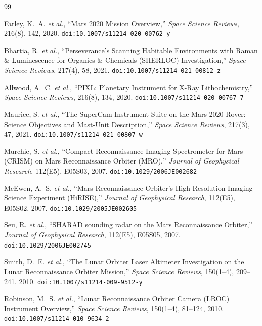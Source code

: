 \documentclass[12pt,a4paper]{article}
\begin{document}
\begin{thebibliography}{99}

Farley, K.~A. \textit{et al.},
``Mars 2020 Mission Overview,''
\textit{Space Science Reviews}, 216(8), 142, 2020.
\texttt{doi:10.1007/s11214-020-00762-y}

Bhartia, R. \textit{et al.},
``Perseverance's Scanning Habitable Environments with Raman \& Luminescence for Organics \& Chemicals (SHERLOC) Investigation,''
\textit{Space Science Reviews}, 217(4), 58, 2021.
\texttt{doi:10.1007/s11214-021-00812-z}

Allwood, A.~C. \textit{et al.},
``PIXL: Planetary Instrument for X-Ray Lithochemistry,''
\textit{Space Science Reviews}, 216(8), 134, 2020.
\texttt{doi:10.1007/s11214-020-00767-7}

Maurice, S. \textit{et al.},
``The SuperCam Instrument Suite on the Mars 2020 Rover: Science Objectives and Mast-Unit Description,''
\textit{Space Science Reviews}, 217(3), 47, 2021.
\texttt{doi:10.1007/s11214-021-00807-w}

Murchie, S. \textit{et al.},
``Compact Reconnaissance Imaging Spectrometer for Mars (CRISM) on Mars Reconnaissance Orbiter (MRO),''
\textit{Journal of Geophysical Research}, 112(E5), E05S03, 2007.
\texttt{doi:10.1029/2006JE002682}

McEwen, A.~S. \textit{et al.},
``Mars Reconnaissance Orbiter's High Resolution Imaging Science Experiment (HiRISE),''
\textit{Journal of Geophysical Research}, 112(E5), E05S02, 2007.
\texttt{doi:10.1029/2005JE002605}

Seu, R. \textit{et al.},
``SHARAD sounding radar on the Mars Reconnaissance Orbiter,''
\textit{Journal of Geophysical Research}, 112(E5), E05S05, 2007.
\texttt{doi:10.1029/2006JE002745}

Smith, D.~E. \textit{et al.},
``The Lunar Orbiter Laser Altimeter Investigation on the Lunar Reconnaissance Orbiter Mission,''
\textit{Space Science Reviews}, 150(1--4), 209--241, 2010.
\texttt{doi:10.1007/s11214-009-9512-y}

Robinson, M.~S. \textit{et al.},
``Lunar Reconnaissance Orbiter Camera (LROC) Instrument Overview,''
\textit{Space Science Reviews}, 150(1--4), 81--124, 2010.
\texttt{doi:10.1007/s11214-010-9634-2}


\end{thebibliography}
\end{document}
